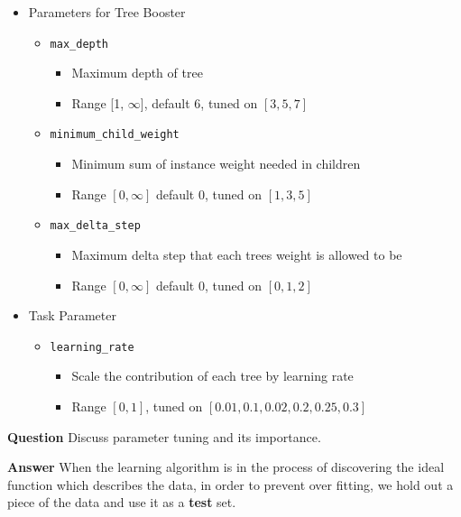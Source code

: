 \documentclass[twoside,openright,titlepage,numbers=noenddot,headinclude,%
               footinclude=true,cleardoublepage=empty,abstractoff,BCOR=5mm,%
               paper=a4,fontsize=11pt,ngerman,american]{scrreprt}
\numberwithin{theorem}{chapter}
\numberwithin{definition}{chapter}
\numberwithin{algorithm}{chapter}
\numberwithin{figure}{chapter}
\numberwithin{table}{chapter}
\numberwithin{equation}{chapter}
\begin{document}
\begin{itemize}
\item Parameters for Tree Booster
    \begin{itemize}
        \item \texttt{max\_depth}
        \begin{itemize}
            \item Maximum depth of tree
            \item Range [1, $\infty$], default 6, tuned on $[3,5,7]$
        \end{itemize}
        \item \texttt{minimum\_child\_weight}
        \begin{itemize}
            \item Minimum sum of instance weight needed in children
            \item Range $[0,\infty]$ default 0, tuned on $[1,3,5]$
        \end{itemize}
        \item \texttt{max\_delta\_step}
        \begin{itemize}
            \item Maximum delta step that each trees weight is allowed to be
            \item Range $[0, \infty]$ default 0, tuned on $[0, 1, 2]$
        \end{itemize}
    \end{itemize}

\item Task Parameter
    \begin{itemize}
        \item \texttt{learning\_rate}
        \begin{itemize}
            \item Scale the contribution of each tree by learning rate
            \item Range $[0, 1]$, tuned on $[0.01, 0.1, 0.02, 0.2, 0.25, 0.3]$
        \end{itemize}
    \end{itemize} 
\end{itemize}

\textbf{Question} Discuss parameter tuning and its importance.

\textbf{Answer} When the learning algorithm is in the process of discovering the ideal function which describes the data, in order to prevent over fitting, we hold out a piece of the data and use it as a \textbf{test} set. 
\end{document}
